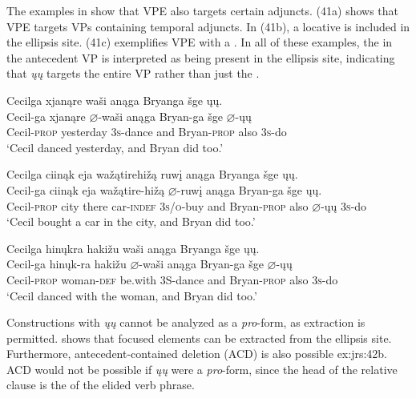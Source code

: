 \documentclass[output=paper]{LSP/langsci}
\begin{document}
The examples in  show that VPE also targets certain adjuncts. (41a) shows that VPE targets VPs containing temporal adjuncts. In (41b), a locative  is included in the ellipsis site. (41c) exemplifies VPE with a . In all of these examples, the  in the antecedent VP is interpreted as being present in the ellipsis site, indicating that \textit{\k{u}\k{u}} targets the entire VP rather than just the .

\ea\label{ex:jrs:41}
\ea
\glll Cecilga 			xjanąre		wa\v{s}i anąga	Bryanga			\v{s}ge  	\k{u}\k{u}.\\
Cecil-ga			xjanąre		$\varnothing$-wa\v{s}i		anąga	Bryan-ga			\v{s}ge		$\varnothing$-\k{u}\k{u} \\
	Cecil-\textsc{prop}		yesterday	\textsc{3s}-dance	and			Bryan-\textsc{prop}	also	\textsc{3s}-do \\
\trans `Cecil danced yesterday, and Bryan did too.'

\ex 
\glll Cecilga 			ciinąk	eja		wa\v{z}ątirehi\v{z}ą		ruw\k{i}	anąga	Bryanga			\v{s}ge  \k{u}\k{u}. \\
Cecil-ga			ciinąk	eja		wa\v{z}ątire-hi\v{z}ą	$\varnothing$-ruw\k{i}			anąga	Bryan-ga	\v{s}ge \k{u}\k{u}. \\
Cecil-\textsc{prop}	city there	car-\textsc{indef}	\textsc{3s/o}-buy and Bryan-\textsc{prop}	also $\varnothing$-\k{u}\k{u} \textsc{3s}-do \\
\trans `Cecil bought a car in the city, and Bryan did too.'

\ex 
\glll Cecilga 		hin\k{u}kra	haki\v{z}u		wa\v{s}i		anąga	Bryanga			\v{s}ge		\k{u}\k{u}.\\
Cecil-ga		hin\k{u}k-ra	haki\v{z}u		$\varnothing$-wa\v{s}i		anąga	Bryan-ga	\v{s}ge		$\varnothing$-\k{u}\k{u} \\	Cecil-\textsc{prop}		woman-\textsc{def} 	be.with		3S-dance	and			Bryan-\textsc{prop}	also	\textsc{3s}-do \\
\trans `Cecil danced with the woman, and Bryan did too.'
\z
\z

Constructions with \textit{\k{u}\k{u}} cannot be analyzed as a \textit{pro}-form, as  extraction is permitted.  shows that focused elements can be extracted from the ellipsis site. Furthermore, antecedent-contained deletion (ACD) is also possible {ex:jrs:42b}. ACD would not be possible if \textit{\k{u}\k{u}} were a \textit{pro}-form, since the head of the relative clause is the  of the elided verb phrase.
\end{document}
